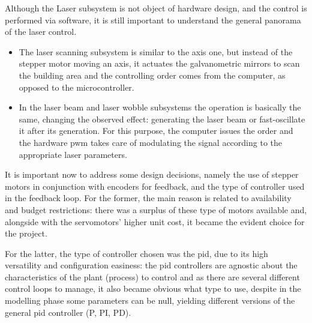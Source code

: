 Although the Laser subsystem is not object of hardware
design, and the control is performed via software, it is
still important to understand the general panorama of the laser control. 
\begin{itemize}
\item The laser scanning subsystem is similar to the axis one, but instead of
  the stepper motor moving an axis, it actuates the galvanometric mirrors to
  scan the building area and the controlling order comes from the computer, as
  opposed to the microcontroller.
\item In the laser beam and laser wobble subsystems the operation is basically
  the same, changing the observed effect: generating the laser beam or
  fast-oscillate it after its generation. For this purpose, the computer
  issues the order and the hardware \gls{pwm} takes care of modulating the
  signal according to the appropriate laser parameters.
\end{itemize}

% 

It is important now to address some design decisions, namely the use of stepper
motors in conjunction with encoders for feedback, and the type of controller
used in the feedback loop. For the former, the main reason is related to
availability and budget restrictions: there was a surplus of these type of motors
available and, alongside with the servomotors' higher unit cost, it became the
evident choice for the project.
% 

For the latter, the type of controller chosen was the \gls{pid}, due to its high
versatility and configuration easiness: the \gls{pid} controllers are
agnostic about the characteristics of the plant (process) to control and as
there are several different control loops to manage, it also became obvious what
type to use, despite in the modelling phase some parameters can be null, yielding
different versions of the general \gls{pid} controller (P, PI, PD).
% 

